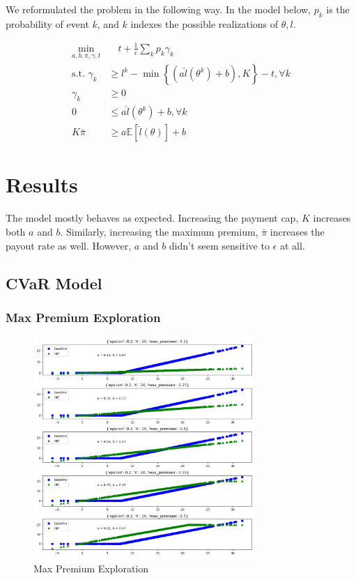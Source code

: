 \documentclass[11pt]{article}
\begin{document}
    We reformulated the problem in the following way. In the model below, $p_k$ is the probability of event $k$, and $k$ indexes the possible realizations of $\theta, l$.

    \begin{align}
        \min_{a,b,\pi,\gamma,t} &\quad t + \frac{1}{\epsilon}\sum_k p_k \gamma_k\\
        \text{s.t.   } \gamma_k &\geq l^k - \min\left\{(a\hat{l}(\theta^k) + b), K\right\} - t, \forall k\\
        \gamma_k &\geq 0 \\
        0 &\leq a\hat{l}(\theta^k) + b, \forall k\\
        K\bar{\pi} &\geq a\mathbb{E}[\hat{l}(\theta)] + b
    \end{align}

\section{Results}
The model mostly behaves as expected. Increasing the payment cap, $K$ increases both $a$ and $b$. Similarly, increasing the maximum premium, $\bar{\pi}$ increases the payout rate as well. However, $a$ and $b$ didn't seem sensitive to $\epsilon$ at all. 
    \subsection*{CVaR Model}
        \subsubsection*{Max Premium Exploration}
        \begin{figure}[H]
            \centering
            \caption{Max Premium Exploration}
            \includegraphics[width=0.75\textwidth]{../../output/figures/CVaR3/max_premium_exploration.png}
        \end{figure}
\end{document}
